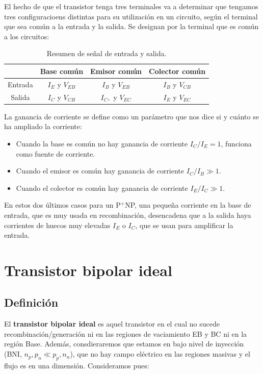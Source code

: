 El hecho de que el transistor tenga tres terminales va a determinar que tengamos tres configuracioens distintas para su utilización en un circuito, según el terminal que sea común a la entrada y la salida. Se designan por la terminal que es común a los circuitos: 

\begin{table}[H] \centering
    \begin{tabular}{c|ccc}
        \toprule &  Base común & Emisor común & Colector común \\ \midrule
        Entrada  & $I_E$ y $V_{EB}$ & $I_B$ y $V_{EB}$ & $I_B$ y $V_{CB}$  \\
        Salida &  $I_C$ y $V_{CB}$ & $I_C,$ y $V_{EC}$ & $I_E$ y $V_{EC}$\\ \bottomrule        
    \end{tabular}
    \caption{Resumen de señal de entrada y salida.}
    \label{Tab:04-02}
\end{table}
La ganancia de corriente se define como un parámetro que nos dice si y cuánto se ha ampliado la corriente: 

\begin{itemize}
    \item Cuando la base es común no hay ganancia de corriente $I_C/I_E=1$, funciona como fuente de corriente. 
    \item Cuando el emisor es común hay ganancia de corriente $I_C/I_B\gg 1$. 
    \item Cuando el colector es común hay ganancia de corriente $I_E/I_C\gg 1$. 
\end{itemize}
En estos dos últimos casos para un P$^+$NP, una pequeña corriente en la base de entrada, que es muy usada en recombinación, desencadena que a la salida haya corrientes de huecos muy elevadas $I_E$ o $I_C$, que se usan para amplificar la entrada. 

\section{Transistor bipolar ideal}

\subsection{Definición}

El \textbf{transistor bipolar ideal} es aquel transistor en el cual no sucede recombinación/generación ni en las regiones de vaciamiento EB y BC ni en la región Base. Además, consdieraremos que estamos en bajo nivel de inyección (BNI, $n_p, p_n \ll p_p,n_n$), que no hay campo eléctrico en las regiones masivas y el flujo es en una dimensión. Consideramos pues:

